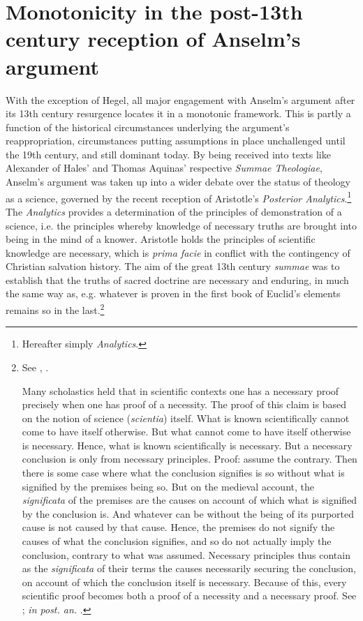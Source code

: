 \documentclass[]{amsart}
\begin{document}
\section{Monotonicity in the post-13th century reception of Anselm's argument}
With the exception of Hegel, all major engagement with Anselm's argument after its 13th century resurgence locates it in a monotonic framework. This is partly a function of the historical circumstances underlying the argument's reappropriation, circumstances putting assumptions in place unchallenged until the 19th century, and still dominant today. By being received into texts like Alexander of Hales' and Thomas Aquinas' respective \textit{Summae Theologiae}, Anselm's argument was taken up into a wider debate over the status of theology as a science, governed by the recent reception of Aristotle's \textit{Posterior Analytics}.\footnote{Hereafter simply \textit{Analytics}.}  The \textit{Analytics} provides a determination of the principles of demonstration of a science, i.e. the principles whereby knowledge of necessary truths are brought into being in the mind of a knower. Aristotle holds the principles of scientific knowledge are necessary, which is \textit{prima facie} in conflict with the contingency of Christian salvation history. The aim of the great 13th century \textit{summae} was to establish that the truths of sacred doctrine are necessary and enduring, in much the same way as, e.g. whatever is proven in the first book of Euclid's elements remains so in the last.\footnote{See \cite[ST Ia, q. 1, art. 2]{AquinasST}, \cite[Ord. I, prol. 1a]{ScotusOrd}.

Many scholastics held that in scientific contexts one has a necessary proof precisely when one has proof of a necessity. The proof of this claim is based on the notion of science (\textit{scientia}) itself. What is known scientifically cannot come to have itself otherwise. But what cannot come to have itself otherwise is necessary. Hence, what is known scientifically is necessary. But a necessary conclusion is only from necessary principles. Proof: assume the contrary. Then there is some case where what the conclusion signifies is so without what is signified by the premises being so. But on the medieval account, the \textit{significata} of the premises are the causes on account of which what is signified by the conclusion is. And whatever can be without the being of its purported cause is not caused by that cause. Hence, the premises do not signify the causes of what the conclusion signifies, and so do not actually imply the conclusion, contrary to what was assumed. Necessary principles thus contain as the \textit{significata} of their terms the causes necessarily securing the conclusion, on account of which the conclusion itself is necessary. Because of this, every scientific proof becomes both a proof of a necessity and a necessary proof. See \cite[74b5-75a7]{Post.An}; \textit{in post. an.} \cite[In post. an. I, lec. 13, c. 6]{AquinasPA}.}
\end{document}
